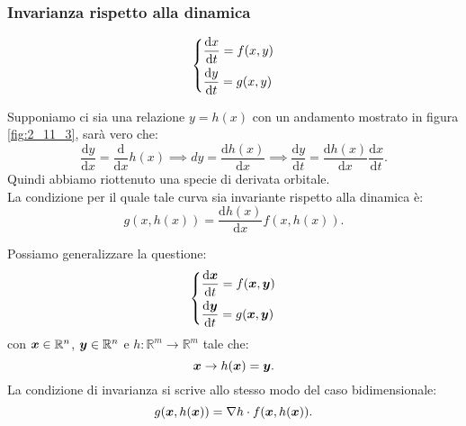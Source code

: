 \subsubsection{Invarianza rispetto alla dinamica}%
\label{subsub:Invarianza rispetto alla dinamica}
\begin{exmp}[]
    \[
    \begin{dcases}
	\frac{\text{d} x}{\text{d} t} = f(x, y) \\
	\frac{\text{d} y}{\text{d} t} = g(x, y) 
    \end{dcases}
    \]
    
	Supponiamo ci sia una relazione $y=h(x)$ con un andamento mostrato in figura \ref{fig:2_11_3}, sarà vero che:
    \[
	\frac{\text{d} y}{\text{d} x} = \frac{\text{d} }{\text{d} x} h(x) \implies 
	dy = \frac{\text{d} h(x) }{\text{d} x} \implies  \frac{\text{d} y}{\text{d} t} = \frac{\text{d} h(x) }{\text{d} x}
	\frac{\text{d} x}{\text{d} t}  
    .\] 
    Quindi abbiamo riottenuto una specie di derivata orbitale. \\
    La condizione per il quale tale curva sia invariante rispetto alla dinamica è:
    \[
	g(x, h(x)) = \frac{\text{d} h(x) }{\text{d} x} f(x, h(x)) 
    .\] 
\end{exmp}
\noindent
Possiamo generalizzare la questione:
\[
\begin{dcases}
    \frac{\text{d} \boldsymbol{x}}{\text{d} t} = f(\boldsymbol{x}, \boldsymbol{y}) \\
    \frac{\text{d} \boldsymbol{y}}{\text{d} t} = g(\boldsymbol{x}, \boldsymbol{y}) 
\end{dcases}
\]
con $\boldsymbol{x}\in \mathbb{R}^n$, $\boldsymbol{y}\in \mathbb{R}^n$ e $h:\mathbb{R}^m\to \mathbb{R}^m$ tale che:
\[
    \boldsymbol{x}\to h(\boldsymbol{x}) = \boldsymbol{y}
.\] 
La condizione di invarianza si scrive allo stesso modo del caso bidimensionale:
\[
    g(\boldsymbol{x}, h(\boldsymbol{x})) = \nabla h \cdot f(\boldsymbol{x}, h(\boldsymbol{x})) 
.\] 

